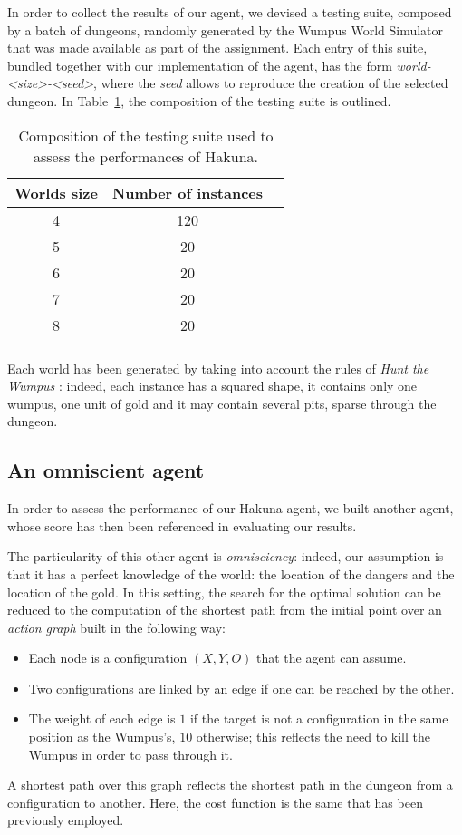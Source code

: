 \documentclass{llncs}
\newcommand{\htw}{\emph{Hunt the Wumpus }}
\begin{document}
In order to collect the results of our agent, we devised a testing suite, composed by a batch of dungeons, randomly generated by the Wumpus World Simulator that was made available as part of the assignment.
Each entry of this suite, bundled together with our implementation of the agent, has the form \emph{world-<size>-<seed>}, where the \emph{seed} allows to reproduce the creation of the selected dungeon.
In Table~\ref{tbl:test}, the composition of the testing suite is outlined.

\begin{table}[t]
	\label{tbl:test}
	\centering
	\begin{tabular}{ccc}
	\toprule
	Worlds size & Number of instances \\
	\midrule
	4 & 120 \\
	5 &  20 \\
	6 &  20 \\
	7 &  20 \\
	8 &  20 \\
	\bottomrule\\
	\end{tabular}
	\caption{Composition of the testing suite used to assess the performances of Hakuna.}
\end{table}

Each world has been generated by taking into account the rules of \htw: indeed, each instance has a squared shape, it contains only one wumpus, one unit of gold and it may contain several pits, sparse through the dungeon.

\subsection{An omniscient agent}

In order to assess the performance of our Hakuna agent, we built another agent, whose score has then been referenced in evaluating our results.

The particularity of this other agent is \emph{omnisciency}: indeed, our assumption is that it has a perfect knowledge of the world: the location of the dangers and the location of the gold.
In this setting, the search for the optimal solution can be reduced to the computation of the shortest path from the initial point over an \emph{action graph} built in the following way:
\begin{itemize}
	\item Each node is a configuration $(X,Y,O)$ that the agent can assume.
	\item Two configurations are linked by an edge if one can be reached by the other.
	\item The weight of each edge is $1$ if the target is not a configuration in the same position as the Wumpus's, $10$ otherwise; this reflects the need to kill the Wumpus in order to pass through it.
\end{itemize}
A shortest path over this graph reflects the shortest path in the dungeon from a configuration to another.
Here, the cost function is the same that has been previously employed.
\end{document}
